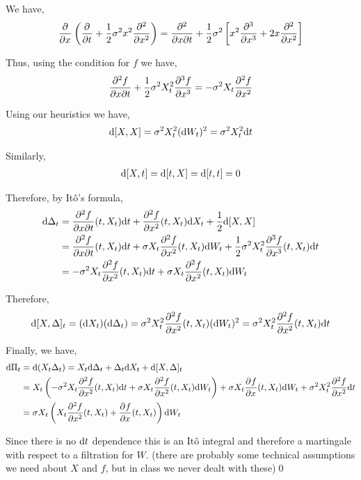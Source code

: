 \documentclass[10pt]{article}
\begin{document}
\begin{solution}[Solution]
We have,
\begin{align*}
    \pp{}{x} \left( \pp{}{t} + \dfrac{1}{2}\sigma^2x^2 \pp[2]{}{x}\right)  
    = \dfrac{\partial^2}{\partial x\partial t} + \dfrac{1}{2}\sigma^2 \left[ x^2 \pp[3]{}{x} + 2x \pp[2]{}{x} \right]
\end{align*}

Thus, using the condition for \( f \) we have,
\begin{align*}
    \dfrac{\partial^2 f}{\partial x\partial t} + \dfrac{1}{2}\sigma^2 X_t^2 \pp[3]{f}{x} = - \sigma^2 X_t \pp[2]{f}{x}
\end{align*}

Using our heuristics we have,
\begin{align*}
    \d[X,X] = \sigma^2 X_t^2 (\d W_t)^2 = \sigma^2 X_t^2 \d t
\end{align*}

Similarly, 
\begin{align*}
    \d[X,t] = \d[t,X] = \d[t,t] = 0
\end{align*}

Therefore, by It\^o's formula,
\begin{align*}
    \d \Delta_t &= \dfrac{\partial^2 f}{\partial x\partial t}(t,X_t) \d t + \pp[2]{f}{x}(t,X_t) \d X_t + \dfrac{1}{2} \d[X,X]
    \\&=  \dfrac{\partial^2 f}{\partial x\partial t}(t,X_t) \d t + \sigma X_t \pp[2]{f}{x}(t,X_t) \d W_t + \dfrac{1}{2}\sigma^2X_t^2 \pp[3]{f}{x}(t,X_t) \d t
    \\&= -\sigma^2 X_t \pp[2]{f}{x}(t,X_t) \d t + \sigma X_t \pp[2]{f}{x}(t,X_t)\d W_t 
\end{align*}

Therefore,
\begin{align*}
    \d[X,\Delta]_t = (\d X_t)(\d \Delta_t) 
    = \sigma^2 X_t^2 \dfrac{\partial^2f}{\partial x^2}(t,X_t) (\d W_t)^2 
    = \sigma^2 X_t^2 \dfrac{\partial^2f}{\partial x^2}(t,X_t) \d t
\end{align*}


Finally, we have,
\begin{align*}
    \d \Pi_t &= \d(X_t \Delta _t) = X_t \d\Delta _t + \Delta_t \d X_t + \d[X,\Delta]_t \\
    &= X_t \left( -\sigma^2 X_t \pp[2]{f}{x}(t,X_t) \d t + \sigma X_t \pp[2]{f}{x}(t,X_t)\d W_t \right) 
    + \sigma X_t \pp{f}{x}(t,X_t) \d W_t 
    + \sigma^2 X_t^2 \pp[2]{f}{x} \d t 
    \\&= \sigma X_t \left( X_t \pp[2]{f}{x}(t,X_t) + \pp{f}{x}(t,X_t)\right) \d W_t
\end{align*}

Since there is no \( \d t \) dependence this is an It\^o integral and therefore a martingale with respect to a filtration for \( W \). (there are probably some technical assumptions we need about \( X \) and \( f \), but in class we never dealt with these)\qed

\end{solution}
\end{document}
